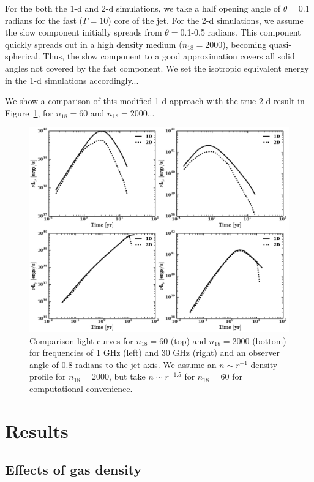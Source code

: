 \documentclass[usenatbib,fleqn]{mnras}
\begin{document}
For the both the 1-d and 2-d simulations, we take a half opening angle
of $\theta=$0.1 radians for the fast ($\Gamma=10$) core of the
jet. For the 2-d simulations, we assume the slow component initially
spreads from $\theta=$0.1-0.5 radians. This component quickly spreads
out in a high density medium ($n_{18}=2000$), becoming
quasi-spherical. Thus, the slow component to a good approximation
covers all solid angles not covered by the fast component. We set the
isotropic equivalent energy in the 1-d simulations accordingly...

We show a comparison of this modified 1-d approach with the true
2-d result in Figure~\ref{fig:1d2dB}, for $n_{18}=60$ and
$n_{18}=2000$...

\begin{figure}
\includegraphics[width=16cm]{1d_2d.pdf}
\caption{\label{fig:1d2dB} Comparison light-curves for $n_{18}=60$
  (top) and $n_{18}=2000$ (bottom) for frequencies of 1 GHz (left) and
  30 GHz (right) and an observer angle of 0.8 radians to the jet
  axis. We assume an $n\sim r^{-1}$ density profile for $n_{18}=2000$,
  but take $n\sim r^{-1.5}$ for $n_{18}=60$ for computational
  convenience.}
\end{figure}


\section{Results}
\label{sec:results}

\subsection{Effects of gas density}
\end{document}
